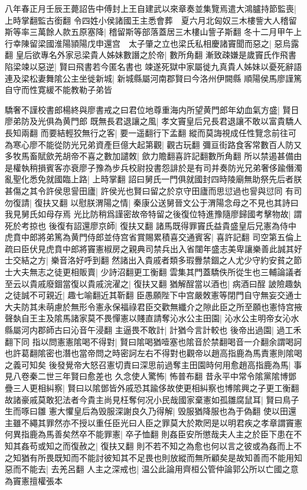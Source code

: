 八年春正月壬辰王薨詔告中傅封上王自建武以來章奏並集覽焉遣大鴻臚持節監喪|{
	上時掌翻監古銜翻}
令四姓小侯諸國王主悉會葬　夏六月北匈奴三木樓訾大人稽留斯等率三萬餘人款五原塞降|{
	稽留斯等部落蓋居三木樓山訾子斯翻}
冬十二月甲午上行幸陳留梁國淮陽頴陽戊申還宫　太子肇之立也梁氏私相慶諸竇聞而惡之|{
	惡烏露翻}
皇后欲專名外家忌梁貴人姊妹數譖之於帝|{
	數所角翻}
漸致疎嫌是歲竇氏作飛書陷梁竦以惡逆|{
	賢曰飛書若今匿名書也}
竦遂死獄中家屬徙九真貴人姊妹以憂死辭語連及梁松妻舞隂公主坐徙新城|{
	新城縣屬河南郡賢曰今洛州伊闕縣}
順陽侯馬廖謹篤自守而性寛緩不能教勒子弟皆

驕奢不謹校書郎楊終與廖書戒之曰君位地尊重海内所望黄門郎年幼血氣方盛|{
	賢日廖弟防及光俱為黄門郎}
既無長君退讓之風|{
	孝文竇皇后兄長君退讓不敢以富貴驕人長知兩翻}
而要結輕狡無行之客|{
	要一遥翻行下孟翻}
縱而莫誨視成任性覽念前往可為寒心廖不能從防光兄弟資產巨億大起第觀|{
	觀古玩翻}
彌亘街路食客常數百人防又多牧馬畜賦歛羌胡帝不喜之數加譴敇|{
	歛力贍翻喜許記翻數所角翻}
所以禁遏甚備由是權執稍損賓客亦衰廖子豫為步兵校尉投書怨誹於是有司并奏防光兄弟奢侈踰僭濁亂聖化悉免就國臨上路|{
	上時掌翻}
詔曰舅氏一門俱就國封四時陵廟無助祭先后者朕甚傷之其令許侯思諐田廬|{
	許侯光也賢曰留之於京守田廬而思愆過也諐與愆同}
有司勿復請|{
	復扶又翻}
以慰朕渭陽之情|{
	秦康公送舅晉文公于渭陽念母之不見也其詩曰我見舅氏如母存焉}
光比防稍爲謹密故帝特留之後復位特進豫隨廖歸國考擊物故|{
	謂死於考掠也}
後復有詔還廖京師|{
	復扶又翻}
諸馬既得罪竇氏益貴盛皇后兄憲為侍中虎賁中郎將弟篤為黄門侍郎並侍宫省賞賜累積喜交通賓客|{
	喜許記翻}
司空第五倫上疏曰臣伏見虎賁中郎將竇憲椒房之親典司禁兵出入省闥年盛志美卑讓樂善此誠其好士交結之方|{
	樂音洛好呼到翻}
然諸出入貴戚者類多瑕釁禁錮之人尤少守約安貧之節士大夫無志之徒更相販賣|{
	少詩沼翻更工衡翻}
雲集其門蓋驕佚所從生也三輔論議者至云以貴戚廢錮當復以貴戚浣濯之|{
	復扶又翻}
猶解酲當以酒也|{
	病酒曰酲}
詖險趣埶之徒誠不可親近|{
	趣七喻翻近其靳翻}
臣愚願陛下中宫嚴敇憲等閉門自守無妄交通士大夫防其未萌慮於無形令憲永保福祿君臣交歡無纖介之隙此臣之所至願也憲恃宫掖聲埶自王主及隂馬諸家莫不畏憚憲以賤直請奪沁水公主田園|{
	沁水公主明帝女沁水縣屬河内郡師古曰沁音午浸翻}
主逼畏不敢計|{
	計猶今言計較也}
後帝出過園|{
	過工禾翻下同}
指以問憲憲隂喝不得對|{
	賢曰隂喝猶噎塞也隂音於禁翻喝音一介翻余謂喝訶也許葛翻隂密也潛也當帝問之時密訶左右不得對也觀帝以趙高指鹿為馬責憲則隂喝之義可知矣}
後發覺帝大怒召憲切責曰深思前過奪主田園時何用愈趙高指鹿為馬|{
	事見八卷秦二世三年賢曰愈差也}
久念使人驚怖|{
	怖普布翻}
昔永平中常令隂黨隂博鄧疊三人更相糾察|{
	賢曰以隂鄧皆外戚恐其踰侈故使更相糾察也博隂興之子更工衡翻}
故諸豪戚莫敢犯法者今貴主尚見枉奪何况小民哉國家棄憲如孤雛腐鼠耳|{
	賢曰鳥子生而啄曰雛}
憲大懼皇后為毁服深謝良久乃得解|{
	毁服猶降服也為于偽翻}
使以田還主雖不繩其罪然亦不授以重任臣光曰人臣之罪莫大於欺罔是以明君疾之孝章謂竇憲何異指鹿為馬善矣然卒不能罪憲|{
	卒子恤翻}
則姦臣安所懲哉夫人主之於臣下患在不知其姦苟或知之而復赦之|{
	復扶又翻}
則不若不知之為愈也何以言之彼或為姦而上不之知猶有所畏既知而不能討彼知其不足畏也則放縱而無所顧矣是故知善而不能用知惡而不能去|{
	去羌呂翻}
人主之深戒也|{
	温公此論用齊桓公管仲論郭公所以亡國之意為竇憲擅權張本}


